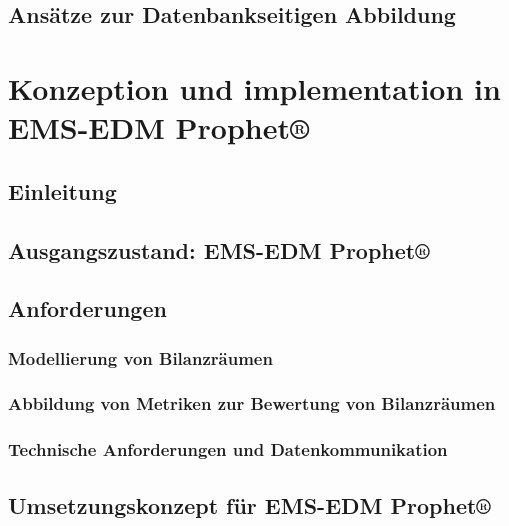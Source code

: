 \documentclass[a4paper,10pt,twoside]{report}
\begin{document}


\section{Ansätze zur Datenbankseitigen Abbildung}







\chapter{Konzeption und implementation in EMS-EDM Prophet®}
\section{Einleitung}

\section{Ausgangszustand: EMS-EDM Prophet®}

\section{Anforderungen}
\subsection{Modellierung von Bilanzräumen}

\subsection{Abbildung von Metriken zur Bewertung von Bilanzräumen}

\subsection{Technische Anforderungen und Datenkommunikation}


\section{Umsetzungskonzept für EMS-EDM Prophet®}
\end{document}
